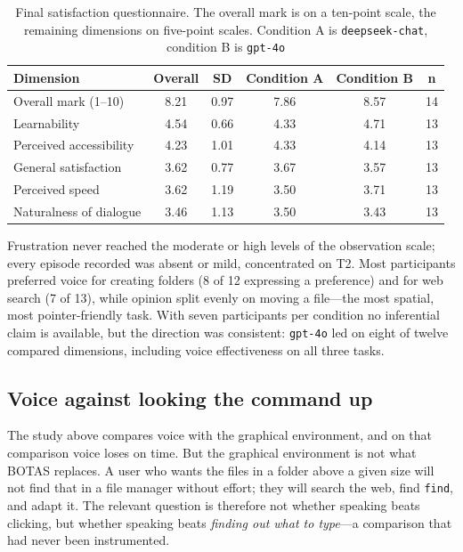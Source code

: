 \documentclass[10pt,a4paper]{article}
\begin{document}
\begin{table}[!ht]
    \centering
    \caption{Final satisfaction questionnaire. The overall mark is on a ten-point scale, the remaining dimensions on five-point scales. Condition A is \texttt{deepseek-chat}, condition B is \texttt{gpt-4o}}
    \label{tab:satisfaction}
    \fontsize{9}{10.8}\selectfont
    \begin{tabular}{lccccc}
        \toprule
        \textbf{Dimension} & \textbf{Overall} & \textbf{SD} & \textbf{Condition A} & \textbf{Condition B} & \textbf{n} \\
        \midrule
        Overall mark (1--10)    & 8.21 & 0.97 & 7.86 & 8.57 & 14 \\
        Learnability            & 4.54 & 0.66 & 4.33 & 4.71 & 13 \\
        Perceived accessibility & 4.23 & 1.01 & 4.33 & 4.14 & 13 \\
        General satisfaction    & 3.62 & 0.77 & 3.67 & 3.57 & 13 \\
        Perceived speed         & 3.62 & 1.19 & 3.50 & 3.71 & 13 \\
        Naturalness of dialogue & 3.46 & 1.13 & 3.50 & 3.43 & 13 \\
        \bottomrule
    \end{tabular}
\end{table}

Frustration never reached the moderate or high levels of the observation scale; every episode recorded was absent or mild, concentrated on T2. Most participants preferred voice for creating folders (8 of 12 expressing a preference) and for web search (7 of 13), while opinion split evenly on moving a file---the most spatial, most pointer-friendly task. With seven participants per condition no inferential claim is available, but the direction was consistent: \texttt{gpt-4o} led on eight of twelve compared dimensions, including voice effectiveness on all three tasks.

\subsection{Voice against looking the command up}
\label{subsec:res-c3}

The study above compares voice with the graphical environment, and on that comparison voice loses on time. But the graphical environment is not what BOTAS replaces. A user who wants the files in a folder above a given size will not find that in a file manager without effort; they will search the web, find \texttt{find}, and adapt it. The relevant question is therefore not whether speaking beats clicking, but whether speaking beats \emph{finding out what to type}---a comparison that had never been instrumented.
\end{document}
